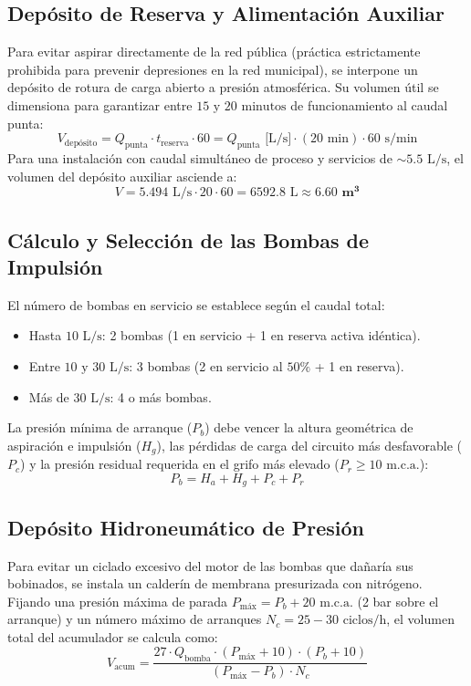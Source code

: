 \documentclass{report}
\begin{document}
\subsection{Depósito de Reserva y Alimentación Auxiliar}
Para evitar aspirar directamente de la red pública (práctica estrictamente prohibida para prevenir depresiones en la red municipal), se interpone un depósito de rotura de carga abierto a presión atmosférica. Su volumen útil se dimensiona para garantizar entre $15\text{ y }20\text{ minutos}$ de funcionamiento al caudal punta:
\begin{equation}
    V_{\text{depósito}} = Q_{\text{punta}} \cdot t_{\text{reserva}} \cdot 60 = Q_{\text{punta}}\text{ [L/s]} \cdot (20\text{ min}) \cdot 60\text{ s/min}
\end{equation}
Para una instalación con caudal simultáneo de proceso y servicios de $\sim 5.5\text{ L/s}$, el volumen del depósito auxiliar asciende a:
\begin{equation}
    V = 5.494\text{ L/s} \cdot 20 \cdot 60 = 6592.8\text{ L} \approx \mathbf{6.60\text{ m}^3}
\end{equation}

\subsection{Cálculo y Selección de las Bombas de Impulsión}
El número de bombas en servicio se establece según el caudal total:
\begin{itemize}
    \item Hasta $10\text{ L/s}$: 2 bombas (1 en servicio + 1 en reserva activa idéntica).
    \item Entre $10\text{ y }30\text{ L/s}$: 3 bombas (2 en servicio al $50\%$ + 1 en reserva).
    \item Más de $30\text{ L/s}$: 4 o más bombas.
\end{itemize}

La presión mínima de arranque ($P_b$) debe vencer la altura geométrica de aspiración e impulsión ($H_g$), las pérdidas de carga del circuito más desfavorable ($P_c$) y la presión residual requerida en el grifo más elevado ($P_r \ge 10\text{ m.c.a.}$):
\begin{equation}
    P_b = H_a + H_g + P_c + P_r
\end{equation}

\subsection{Depósito Hidroneumático de Presión}
Para evitar un ciclado excesivo del motor de las bombas que dañaría sus bobinados, se instala un calderín de membrana presurizada con nitrógeno. Fijando una presión máxima de parada $P_{\text{máx}} = P_b + 20\text{ m.c.a.}$ (2 bar sobre el arranque) y un número máximo de arranques $N_c = 25-30\text{ ciclos/h}$, el volumen total del acumulador se calcula como:
\begin{equation}
    V_{\text{acum}} = \frac{27 \cdot Q_{\text{bomba}} \cdot (P_{\text{máx}} + 10) \cdot (P_b + 10)}{(P_{\text{máx}} - P_b) \cdot N_c}
\end{equation}
\end{document}
